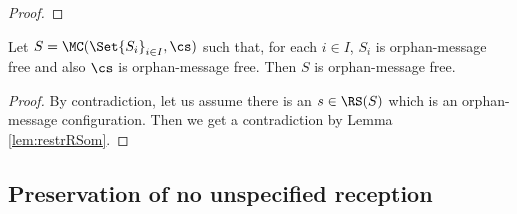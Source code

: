 \begin{proof}
%
%
%
\end{proof}


\begin{corollary}%
\label{prop:nomPreservation}
Let $S = \MC(\Set{S_i}_{i\in I}, \cs)$ such that, for each $i\in I$, 
$S_i$ is orphan-message free and also $\cs$ is orphan-message free.
Then $S$ is orphan-message free.
\end{corollary}
\begin{proof}
By contradiction, let us assume there is an $s\in \RS(S)$ which is an orphan-message configuration. Then we get
a contradiction by Lemma \ref{lem:restrRSom}.
\end{proof}


\subsection{Preservation of no unspecified reception}

